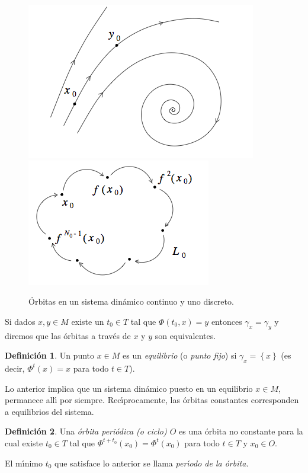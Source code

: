 \documentclass[11pt]{book}
\theoremstyle{definition}
\newtheorem{definition}{Definición}
\numberwithin{definition}{section}
\theoremstyle{theorem}
\numberwithin{theorem}{section}
\numberwithin{lemma}{section}
\numberwithin{corollary}{section}
\theoremstyle{plain}
\numberwithin{example}{section}
\begin{document}
\begin{figure} \centering \label{fig:orbits}
    \includegraphics[scale=0.5]{figures/orbit-continuous.png}
    \includegraphics[scale=0.5]{figures/orbit-discrete.png}    
    \caption{Órbitas en un sistema dinámico continuo y uno discreto.}
\end{figure}

Si dados $x, y \in M$ existe un $t_0 \in T$ tal que $\Phi \left( t_0, x
\right) = y$ entonces $\gamma_x = \gamma_y$ y diremos que las \'orbitas a
trav\'es de $x$ y $y$ son equivalentes.

\begin{definition}
  \label{def:equilibrium}Un punto $x \in M$ es un {\emph{equilibrio}} (o
  {\emph{punto fijo}}) si $\gamma_x = \left\{ x \right\}$ (es decir,
  $\Phi^t \left( x \right) = x$ para todo $t \in T$).
\end{definition}

Lo anterior implica que un sistema din\'amico puesto en un equilibrio $x
\in M$, permanece all\'{\i} por siempre. Rec\'{\i}procamente, las \'orbitas
constantes corresponden a equilibrios del sistema.

\begin{definition}
  \label{def:periodicorbit}Una {\emph{\'orbita peri\'odica (o ciclo) $O$}}
  es una \'orbita no constante para la cual existe $t_0 \in T$ tal que
  $\Phi^{t + t_0} \left( x_0 \right) = \Phi^t \left( x_0 \right)$ para todo $t
  \in T$ y $x_0 \in O$.
  
  El m\'{\i}nimo $t_0$ que satisface lo anterior se llama
  {\emph{per\'{\i}odo de la \'orbita.}}
\end{definition}
\end{document}
